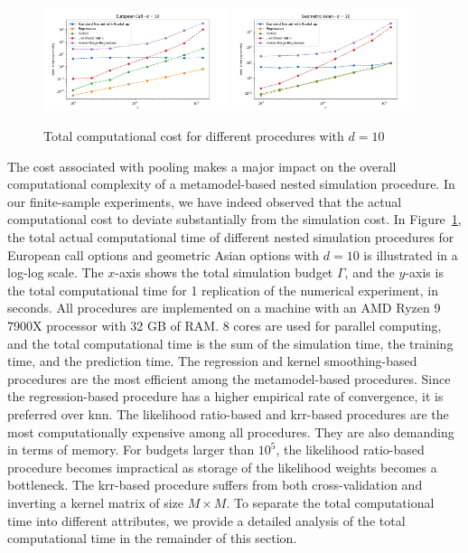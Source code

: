 \begin{figure}[ht!]
    \centering
    \includegraphics[width=0.48\textwidth]{./project1/figures/figure11a.png}
    \includegraphics[width=0.48\textwidth]{./project1/figures/figure11b.png}
    \caption{Total computational cost for different procedures with $d=10$}
\label{fig1:tcc}
\end{figure}

The cost associated with pooling makes a major impact on the overall computational complexity of a metamodel-based nested simulation procedure.
In our finite-sample experiments, we have indeed observed that the actual computational cost to deviate substantially from the simulation cost.
In Figure~\ref{fig1:tcc}, the total actual computational time of different nested simulation procedures for European call options and geometric Asian options with $d = 10$ is illustrated in a log-log scale.
The $x$-axis shows the total simulation budget $\Gamma$, and the $y$-axis is the total computational time for 1 replication of the numerical experiment, in seconds.
All procedures are implemented on a machine with an AMD Ryzen 9 7900X processor with 32 GB of RAM.
8 cores are used for parallel computing, and the total computational time is the sum of the simulation time, the training time, and the prediction time.
The regression and kernel smoothing-based procedures are the most efficient among the metamodel-based procedures.
Since the regression-based procedure has a higher empirical rate of convergence, it is preferred over \gls{knn}.
The likelihood ratio-based and \gls{krr}-based procedures are the most computationally expensive among all procedures.
They are also demanding in terms of memory.
For budgets larger than $10^5$, the likelihood ratio-based procedure becomes impractical as storage of the likelihood weights becomes a bottleneck.
The \gls{krr}-based procedure suffers from both cross-validation and inverting a kernel matrix of size $M \times M$.
To separate the total computational time into different attributes, we provide a detailed analysis of the total computational time in the remainder of this section.


